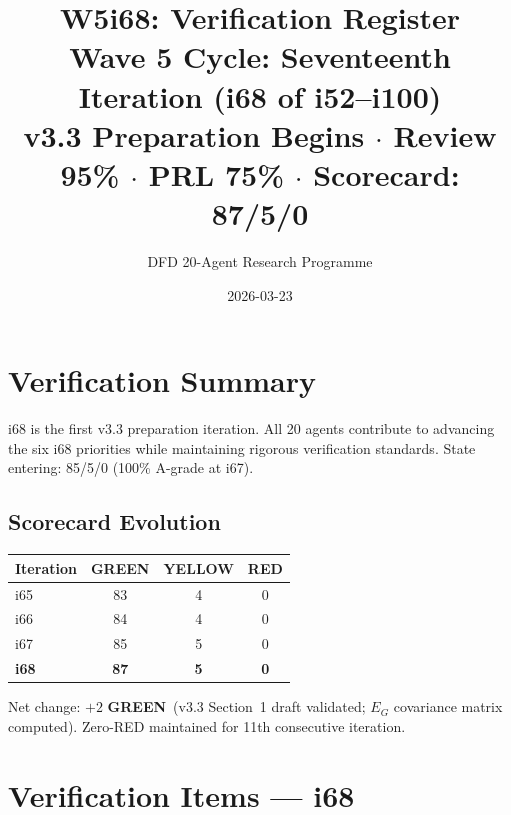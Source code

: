 \documentclass[11pt,a4paper]{article}
\title{\Large W5i68: Verification Register\\[6pt]
\normalsize Wave 5 Cycle: Seventeenth Iteration (i68 of i52--i100)\\[6pt]
v3.3 Preparation Begins $\cdot$ Review 95\% $\cdot$ PRL 75\% $\cdot$ Scorecard: 87/5/0}
\author{DFD 20-Agent Research Programme}
\date{2026-03-23}
\newcommand{\GREEN}{\textcolor{dfdgreen}{\textbf{GREEN}}}
\begin{document}
\maketitle

\section{Verification Summary}

i68 is the first v3.3 preparation iteration. All 20 agents contribute to advancing the six i68 priorities while maintaining rigorous verification standards. State entering: 85/5/0 (100\% A-grade at i67).

\subsection{Scorecard Evolution}

\begin{center}
\begin{tabular}{lccc}
\toprule
\textbf{Iteration} & \textbf{GREEN} & \textbf{YELLOW} & \textbf{RED} \\
\midrule
i65 & 83 & 4 & 0 \\
i66 & 84 & 4 & 0 \\
i67 & 85 & 5 & 0 \\
\textbf{i68} & \textbf{87} & \textbf{5} & \textbf{0} \\
\bottomrule
\end{tabular}
\end{center}

Net change: $+2$ \GREEN\ (v3.3 Section~1 draft validated; $E_G$ covariance matrix computed). Zero-RED maintained for 11th consecutive iteration.

\section{Verification Items --- i68}
\end{document}
